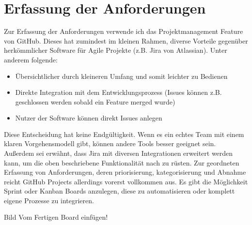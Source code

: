 \documentclass{article}
\begin{document}

\section{Erfassung der Anforderungen}

Zur Erfassung der Anforderungen verwende ich das Projektmanagement Feature von GitHub. Dieses hat zumindest im
kleinen Rahmen, diverse Vorteile gegenüber herkömmlicher Software für Agile Projekte (z.B. Jira von Atlassian).
Unter anderem folgende:

\begin{itemize}
	\item Übersichtlicher durch kleineren Umfang und somit leichter zu Bedienen
	\item Direkte Integration mit dem Entwicklungsprozess (Issues können z.B.
	      geschlossen werden sobald ein Feature merged wurde)
	\item Nutzer der Software können direkt Issues anlegen
\end{itemize}

Diese Entscheidung hat keine Endgültigkeit. Wenn es ein echtes Team mit einem klaren Vorgehensmodell gibt, können
andere Tools besser geeignet sein. Außerdem sei erwähnt, dass Jira mit diversen Integrationen erweitert werden
kann, um die oben beschriebene Funktionalität nach zu rüsten. Zur geordneten Erfassung von Anforderungen, deren
priorisierung, kategorisierung und Abnahme reicht GitHub Projects allerdings vorerst vollkommen aus. Es gibt die
Möglichkeit Sprint oder Kanban Boards anzulegen, diese zu automatisieren oder komplett eigene Prozesse zu
integrieren.

\vspace{100px}
\begin{center}
	\large{Bild Vom Fertigen Board einfügen!}
\end{center}
\vspace{100px}
\end{document}
